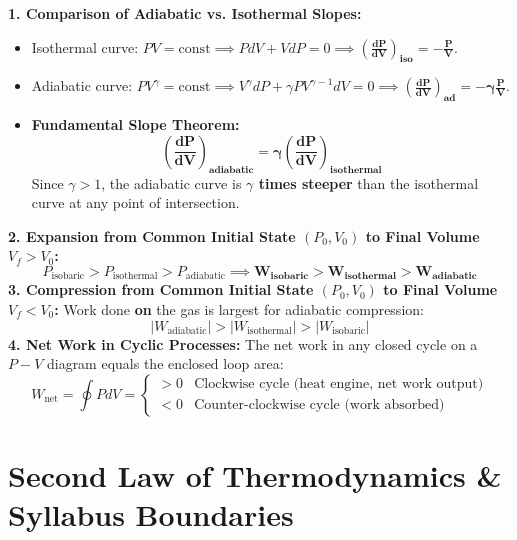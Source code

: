 \documentclass[10pt,a4paper]{article}
\begin{document}
\begin{usecasebox}
\textbf{1. Comparison of Adiabatic vs. Isothermal Slopes:}
\begin{itemize}
  \item Isothermal curve: $P V = \text{const} \implies P dV + V dP = 0 \implies \mathbf{\left(\frac{dP}{dV}\right)_{\text{iso}} = -\frac{P}{V}}$.
  \item Adiabatic curve: $P V^\gamma = \text{const} \implies V^\gamma dP + \gamma P V^{\gamma-1} dV = 0 \implies \mathbf{\left(\frac{dP}{dV}\right)_{\text{ad}} = -\gamma \frac{P}{V}}$.
  \item \textbf{Fundamental Slope Theorem:}
  \begin{equation}
    \mathbf{\left(\frac{dP}{dV}\right)_{\text{adiabatic}} = \gamma \left(\frac{dP}{dV}\right)_{\text{isothermal}}}
  \end{equation}
  Since $\gamma > 1$, the adiabatic curve is \textbf{$\gamma$ times steeper} than the isothermal curve at any point of intersection.
\end{itemize}
\textbf{2. Expansion from Common Initial State $(P_0, V_0)$ to Final Volume $V_f > V_0$:}
\begin{equation}
  P_{\text{isobaric}} > P_{\text{isothermal}} > P_{\text{adiabatic}} \implies \mathbf{W_{\text{isobaric}} > W_{\text{isothermal}} > W_{\text{adiabatic}}}
\end{equation}
\textbf{3. Compression from Common Initial State $(P_0, V_0)$ to Final Volume $V_f < V_0$:}
Work done \textbf{on} the gas is largest for adiabatic compression:
\begin{equation}
  |W_{\text{adiabatic}}| > |W_{\text{isothermal}}| > |W_{\text{isobaric}}|
\end{equation}
\textbf{4. Net Work in Cyclic Processes:}
The net work in any closed cycle on a $P-V$ diagram equals the enclosed loop area:
\begin{equation}
  W_{\text{net}} = \oint P dV = \begin{cases} > 0 & \text{Clockwise cycle (heat engine, net work output)} \\ < 0 & \text{Counter-clockwise cycle (work absorbed)} \end{cases}
\end{equation}
\end{usecasebox}

\section{Second Law of Thermodynamics \& Syllabus Boundaries}
\end{document}
